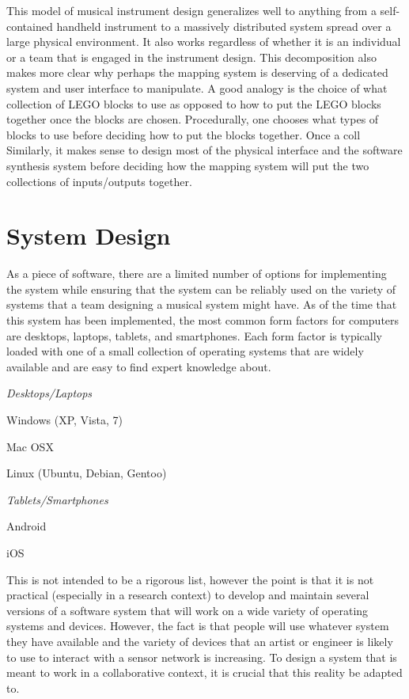 This model of musical instrument design generalizes well to anything from a self-contained handheld instrument to a massively distributed system spread over a large physical environment. It also works regardless of whether it is an individual or a team that is engaged in the instrument design. This decomposition also makes more clear why perhaps the mapping system is deserving of a dedicated system and user interface to manipulate. A good analogy is the choice of what collection of LEGO blocks to use as opposed to how to put the LEGO blocks together once the blocks are chosen. Procedurally, one chooses what types of blocks to use before deciding how to put the blocks together. Once a coll Similarly, it makes sense to design most of the physical interface and the software synthesis system before deciding how the mapping system will put the two collections of inputs/outputs together.

\section{System Design}

As a piece of software, there are a limited number of options for implementing the system while ensuring that the system can be reliably used on the variety of systems that a team designing a musical system might have. As of the time that this system has been implemented, the most common form factors for computers are desktops, laptops, tablets, and smartphones. Each form factor is typically loaded with one of a small collection of operating systems that are widely available and are easy to find expert knowledge about.

\begin{description}
\item \emph{Desktops/Laptops}
\begin{description}
\item Windows (XP, Vista, 7)
\item Mac OSX
\item Linux (Ubuntu, Debian, Gentoo)
\end{description}
\item \emph{Tablets/Smartphones}
\begin{description}
\item Android
\item iOS
\end{description}
\end{description}

This is not intended to be a rigorous list, however the point is that it is not practical (especially in a research context) to develop and maintain several versions of a software system that will work on a wide variety of operating systems and devices. However, the fact is that people will use whatever system they have available and the variety of devices that an artist or engineer is likely to use to interact with a sensor network is increasing. To design a system that is meant to work in a collaborative context, it is crucial that this reality be adapted to.

